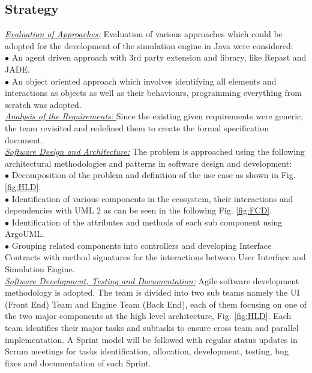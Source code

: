 \documentclass[11pt]{article}
\begin{document}
	\subsection{Strategy}\label{Strat}
		\underline{ \textit{Evaluation of Approaches:}} Evaluation of various approaches which could be adopted for the development of the simulation engine in Java were considered:\\
		 $\bullet$ An agent driven approach with 3rd party extension and library, like Repast and JADE.\\
		 $\bullet$ An object oriented approach which involves identifying all elements and interactions as objects as well as their behaviours, programming everything from scratch was adopted. 
	\\
	\underline { \textit{Analysis of the Requirements:} }
	Since the existing given requirements were generic, the team revisited and redefined them to create the formal specification document.  \\
	\underline { \textit{Software Design and Architecture:}} The problem is approached using the following architectural methodologies and patterns in software design and development:
	\\ $\bullet$ Decomposition of the problem and definition of the use case as shown in Fig. \ref{fig:HLD}. \\
		$\bullet$ Identification of various components in the ecosystem, their interactions and dependencies with UML 2 as can be seen in the following Fig. \ref{fig:FCD}.\\
		$\bullet$ Identification of the attributes and methods of each sub component using ArgoUML.\\
		$\bullet$ Grouping related components into controllers and developing Interface Contracts with method signatures for the interactions between User Interface and Simulation Engine.\\
	\underline {\textit{Software Development, Testing and Documentation:}} Agile software development methodology is adopted. The team is divided into two sub teams namely the UI (Front End) Team and Engine Team (Back End), each of them focusing on one of the two major components at the high level architecture, Fig. \ref{fig:HLD}. Each team identifies their major tasks and subtasks to ensure cross team and parallel implementation. A Sprint model will be followed with regular status updates in Scrum meetings for tasks identification, allocation, development, testing, bug fixes and documentation of each Sprint.
\end{document}
